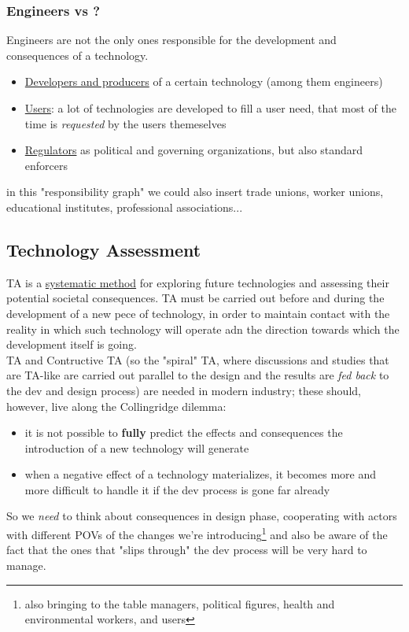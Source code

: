 \documentclass{article}
\begin{document}
			\subsubsection{Engineers vs ?}
				Engineers are not the only ones responsible for the development and consequences of a technology.
				\begin{itemize}
					\item \underline{Developers and producers} of a certain technology (among them engineers)
					\item \underline{Users}: a lot of technologies are developed to fill a user need, that most of the time is \textit{requested} by the users themeselves
					\item \underline{Regulators} as political and governing organizations, but also standard enforcers
				\end{itemize}
				in this "responsibility graph" we could also insert trade unions, worker unions, educational institutes, professional associations...

		\subsection{Technology Assessment}
			TA is a \underline{systematic method} for exploring future technologies and assessing their potential societal consequences. TA must be carried out before and during the development of a new pece of technology, in order to maintain contact with the reality in which such technology will operate adn the direction towards which the development itself is going.\\
			TA and Contructive TA (so the "spiral" TA, where discussions and studies that are TA-like are carried out parallel to the design and the results are \textit{fed back} to the dev and design process) are needed in modern industry; these should, however, live along the Collingridge dilemma:
			\begin{itemize}
				\item it is not possible to \textbf{fully} predict the effects and consequences the introduction of a new technology will generate
				\item when a negative effect of a technology materializes, it becomes more and more difficult to handle it if the dev process is gone far already
			\end{itemize}
			So we \textit{need} to think about consequences in design phase, cooperating with actors with different POVs of the changes we're introducing\footnote{also bringing to the table managers, political figures, health and environmental workers, and users} and also be aware of the fact that the ones that "slips through" the dev process will be very hard to manage.
	
\end{document}
